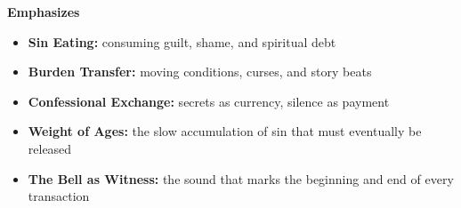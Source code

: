 \noindent\textbf{Emphasizes}
\begin{itemize}
  \item \textbf{Sin Eating:} consuming guilt, shame, and spiritual debt
  \item \textbf{Burden Transfer:} moving conditions, curses, and story beats
  \item \textbf{Confessional Exchange:} secrets as currency, silence as payment
  \item \textbf{Weight of Ages:} the slow accumulation of sin that must eventually be released
  \item \textbf{The Bell as Witness:} the sound that marks the beginning and end of every transaction
\end{itemize}

